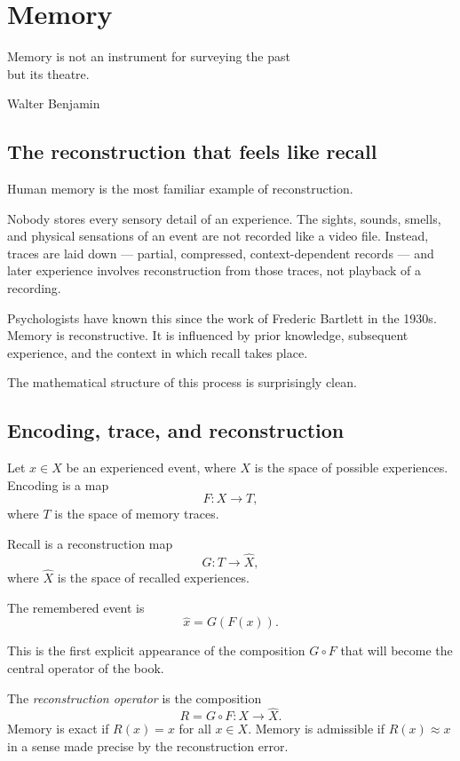 
\chapter{Memory}
\label{ch:memory}

\epigraph{%
  Memory is not an instrument for surveying the past\\
  but its theatre.%
}{Walter Benjamin}

\section{The reconstruction that feels like recall}

Human memory is the most familiar example of reconstruction.

Nobody stores every sensory detail of an experience.
The sights, sounds, smells, and physical sensations of an event
are not recorded like a video file.
Instead, traces are laid down --- partial, compressed,
context-dependent records --- and later experience involves
reconstruction from those traces, not playback of a recording.

Psychologists have known this since the work of Frederic Bartlett
in the 1930s.
Memory is reconstructive.
It is influenced by prior knowledge, subsequent experience,
and the context in which recall takes place.

The mathematical structure of this process is surprisingly clean.

\section{Encoding, trace, and reconstruction}

Let $x \in X$ be an experienced event, where $X$ is the space of
possible experiences.
Encoding is a map
\[
  F : X \to T,
\]
where $T$ is the space of memory traces.

Recall is a reconstruction map
\[
  G : T \to \hat{X},
\]
where $\hat{X}$ is the space of recalled experiences.

The remembered event is
\[
  \hat{x} = G(F(x)).
\]

This is the first explicit appearance of the composition
$G \circ F$ that will become the central operator of the book.

\begin{definition}
  The \emph{reconstruction operator} is the composition
  \[
    R = G \circ F : X \to \hat{X}.
  \]
  Memory is exact if $R(x) = x$ for all $x \in X$.
  Memory is admissible if $R(x) \approx x$ in a sense made
  precise by the reconstruction error.
\end{definition}

